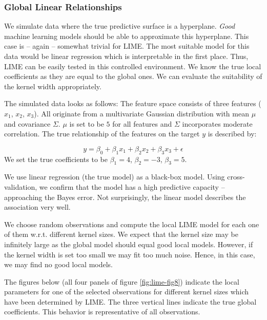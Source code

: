\documentclass[]{krantz}
\begin{document}
\subsubsection{Global Linear Relationships}\label{id411}

We simulate data where the true predictive surface is a hyperplane.
\emph{Good} machine learning models should be able to approximate this
hyperplane. This case is -- again -- somewhat trivial for LIME. The most
suitable model for this data would be linear regression which is
interpretable in the first place. Thus, LIME can be easily tested in
this controlled environment. We know the true local coefficients as they
are equal to the global ones. We can evaluate the suitability of the
kernel width appropriately.

The simulated data looks as follows: The feature space consists of three
features (\(x_1\), \(x_2\), \(x_3\)). All originate from a multivariate
Gaussian distribution with mean \(\mu\) and covariance \(\Sigma\).
\(\mu\) is set to be \(5\) for all features and \(\Sigma\) incorporates
moderate correlation. The true relationship of the features on the
target \(y\) is described by:

\[ y = \beta_0 + \beta_1 x_1 + \beta_2 x_2 + \beta_3 x_3 + \epsilon \]
We set the true coefficients to be \(\beta_1 = 4\), \(\beta_2 = -3\),
\(\beta_3 = 5\).

We use linear regression (the true model) as a black-box model. Using
cross-validation, we confirm that the model has a high predictive
capacity -- approaching the Bayes error. Not surprisingly, the linear
model describes the association very well.

We choose random observations and compute the local LIME model for each
one of them w.r.t. different kernel sizes. We expect that the kernel
size may be infinitely large as the global model should equal good local
models. However, if the kernel width is set too small we may fit too
much noise. Hence, in this case, we may find no good local models.

The figures below (all four panels of figure \ref{fig:lime-fig8})
indicate the local parameters for one of the selected observations for
different kernel sizes which have been determined by LIME. The three
vertical lines indicate the true global coefficients. This behavior is
representative of all observations.
\end{document}

